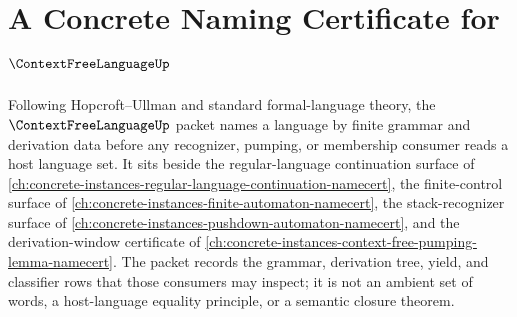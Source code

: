 \chapter{A Concrete Naming Certificate for $\ContextFreeLanguageUp$}
\label{ch:concrete-instances-context-free-language-namecert}

Following Hopcroft--Ullman and standard formal-language theory, the $\ContextFreeLanguageUp$ packet names a language by finite grammar and derivation data before any recognizer, pumping, or membership consumer reads a host language set. It sits beside the regular-language continuation surface of \autoref{ch:concrete-instances-regular-language-continuation-namecert}, the finite-control surface of \autoref{ch:concrete-instances-finite-automaton-namecert}, the stack-recognizer surface of \autoref{ch:concrete-instances-pushdown-automaton-namecert}, and the derivation-window certificate of \autoref{ch:concrete-instances-context-free-pumping-lemma-namecert}. The packet records the grammar, derivation tree, yield, and classifier rows that those consumers may inspect; it is not an ambient set of words, a host-language equality principle, or a semantic closure theorem.

